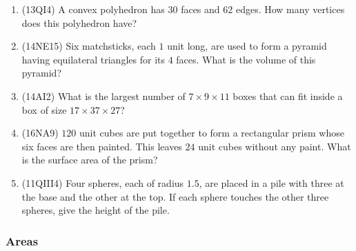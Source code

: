 \documentclass[10pt,paper=letter]{scrartcl}
\begin{document}
\begin{enumerate}

\item (13QI4) A convex polyhedron has $30$ faces and $62$ edges. How many vertices does this polyhedron have?

\item (14NE15) Six matchsticks, each $1$ unit long, are used to form a pyramid having equilateral triangles for its $4$ faces. What is the volume of this pyramid?

\item (14AI2) What is the largest number of $7 \times 9 \times 11$ boxes that can fit inside a box of size $17 \times 37 \times 27$?

\item (16NA9) $120$ unit cubes are put together to form a rectangular prism whose six faces are then painted. This leaves $24$ unit cubes without any paint. What is the surface area of the prism?

\item (11QIII4) Four spheres, each of radius $1.5$, are placed in a pile with three at the base and the other at the top. If each sphere touches the other three spheres, give the height of the pile.

\end{enumerate}

\subsubsection*{Areas}
\end{document}

